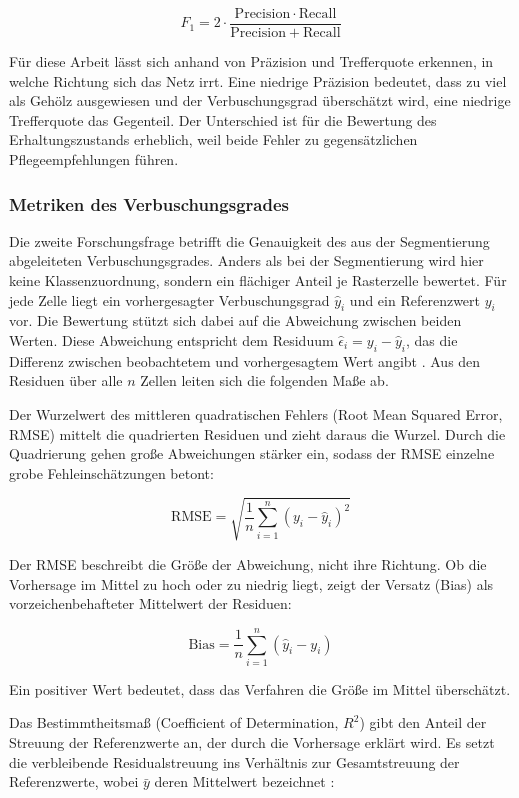 \[
    F_1 = 2 \cdot \frac{\mathrm{Precision} \cdot \mathrm{Recall}}
                       {\mathrm{Precision} + \mathrm{Recall}}
\]

Für diese Arbeit lässt sich anhand von Präzision und Trefferquote erkennen, in welche Richtung sich das Netz irrt.
 Eine niedrige Präzision bedeutet, dass zu viel als Gehölz ausgewiesen und der Verbuschungsgrad überschätzt wird, eine niedrige Trefferquote das Gegenteil. Der Unterschied ist für die Bewertung des Erhaltungszustands erheblich, weil beide Fehler zu gegensätzlichen Pflegeempfehlungen führen.

\subsubsection{Metriken des Verbuschungsgrades}

Die zweite Forschungsfrage betrifft die Genauigkeit des aus der Segmentierung abgeleiteten Verbuschungsgrades. Anders als bei der Segmentierung wird hier keine Klassenzuordnung, sondern ein flächiger Anteil je Rasterzelle bewertet. Für jede Zelle liegt ein vorhergesagter Verbuschungsgrad $\hat{y}_i$ und ein Referenzwert $y_i$ vor. Die Bewertung stützt sich dabei auf die Abweichung zwischen beiden Werten. Diese Abweichung entspricht dem Residuum $\hat{\epsilon}_i = y_i - \hat{y}_i$, das die Differenz zwischen beobachtetem und vorhergesagtem Wert angibt \cite{Fahrmeir.2023}. Aus den Residuen über alle $n$ Zellen leiten sich die folgenden Maße ab.

Der Wurzelwert des mittleren quadratischen Fehlers (Root Mean Squared Error, RMSE) mittelt die quadrierten Residuen und zieht daraus die Wurzel. Durch die Quadrierung gehen große Abweichungen stärker ein, sodass der RMSE einzelne grobe Fehleinschätzungen betont:

\[
    \mathrm{RMSE} = \sqrt{\frac{1}{n} \sum_{i=1}^{n} (y_i - \hat{y}_i)^2}
\]

Der RMSE beschreibt die Größe der Abweichung, nicht ihre Richtung. Ob die Vorhersage im Mittel zu hoch oder zu niedrig liegt, zeigt der Versatz (Bias) als vorzeichenbehafteter Mittelwert der Residuen:

\[
    \mathrm{Bias} = \frac{1}{n} \sum_{i=1}^{n} (\hat{y}_i - y_i)
\]

Ein positiver Wert bedeutet, dass das Verfahren die Größe im Mittel überschätzt.

Das Bestimmtheitsmaß (Coefficient of Determination, $R^2$) gibt den Anteil der Streuung der Referenzwerte an, der durch die Vorhersage erklärt wird. Es setzt die verbleibende Residualstreuung ins Verhältnis zur Gesamtstreuung der Referenzwerte, wobei $\bar{y}$ deren Mittelwert bezeichnet \cite{Fahrmeir.2023}:

